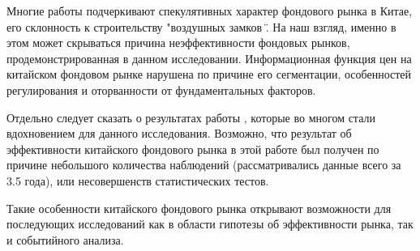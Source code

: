 \documentclass[a4paper,12pt]{article}
\begin{document}
Многие работы подчеркивают спекулятивных характер фондового рынка в Китае, его склонность к строительству "воздушных замков \". На наш взгляд, именно в этом может скрываться причина неэффективности фондовых рынков, продемонстрированная в данном исследовании. Информационная функция цен на китайском фондовом рынке нарушена по причине его сегментации, особенностей регулирования и оторванности от фундаментальных факторов.

Отдельно следует сказать о результатах работы \cite{Liu1997}, которые во многом стали вдохновением для данного исследования. Возможно, что результат об эффективности китайского фондового рынка в этой работе был получен по причине небольшого количества наблюдений (рассматривались данные всего за 3.5 года), или несовершенств статистических тестов.

Такие особенности китайского фондового рынка открывают возможности для последующих исследований как в области гипотезы об эффективности рынка, так и событийного анализа.
\newpage


\end{document}
